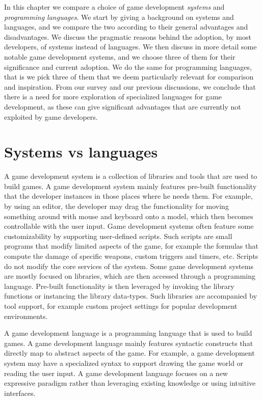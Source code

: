 In this chapter we compare a choice of game development \textit{systems} and \textit{programming languages}. We start by giving a background on systems and languages, and we compare the two according to their general advantages and disadvantages. We discuss the pragmatic reasons behind the adoption, by most developers, of systems instead of languages. We then discuss in more detail some notable game development systems, and we choose three of them for their significance and current adoption. We do the same for programming languages, that is we pick three of them that we deem particularly relevant for comparison and inspiration. From our survey and our previous discussions, we conclude that there is a need for more exploration of specialized languages for game development, as these can give significant advantages that are currently not exploited by game developers.


\section{Systems vs languages}
A game development system is a collection of libraries and tools that are used to build games. A game development system mainly features pre-built functionality that the developer instances in those places where he needs them. For example, by using an editor, the developer may drag the functionality for moving something around with mouse and keyboard onto a model, which then becomes controllable with the user input. Game development systems often feature some customizability by supporting user-defined scripts. Such scripts are small programs that modify limited aspects of the game, for example the formulas that compute the damage of specific weapons, custom triggers and timers, etc. Scripts do not modify the core services of the system. Some game development systems are mostly focused on libraries, which are then accessed through a programming language. Pre-built functionality is then leveraged by invoking the library functions or instancing the library data-types. Such libraries are accompanied by tool support, for example custom project settings for popular development environments.

A game development language is a programming language that is used to build games. A game development language mainly features syntactic constructs that directly map to abstract aspects of the game. For example, a game development system may have a specialized syntax to support drawing the game world or reading the user input. A game development language focuses on a new expressive paradigm rather than leveraging existing knowledge or using intuitive interfaces.

